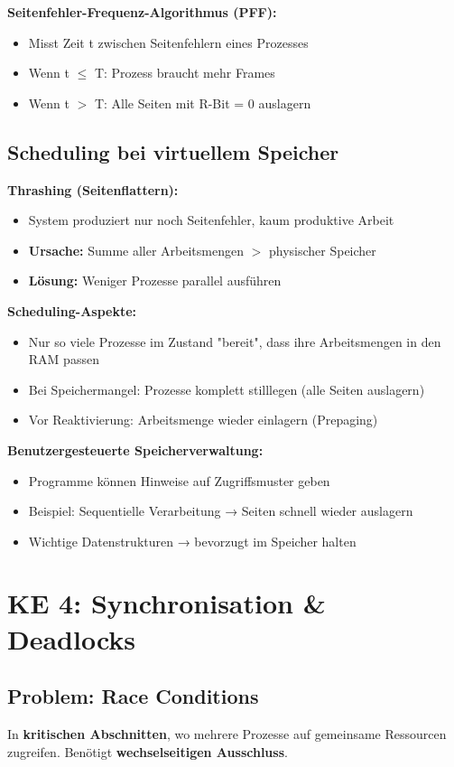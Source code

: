 \documentclass[9pt,a4paper]{extarticle}
\begin{document}
\begin{multicols*}{2}
\textbf{Seitenfehler-Frequenz-Algorithmus (PFF):}
\begin{itemize}
\item Misst Zeit t zwischen Seitenfehlern eines Prozesses
\item Wenn t $\leq$ T: Prozess braucht mehr Frames
\item Wenn t $>$ T: Alle Seiten mit R-Bit = 0 auslagern
\end{itemize}

\subsection{Scheduling bei virtuellem Speicher}
\textbf{Thrashing (Seitenflattern):}
\begin{itemize}
\item System produziert nur noch Seitenfehler, kaum produktive Arbeit
\item \textbf{Ursache:} Summe aller Arbeitsmengen $>$ physischer Speicher
\item \textbf{Lösung:} Weniger Prozesse parallel ausführen
\end{itemize}

\textbf{Scheduling-Aspekte:}
\begin{itemize}
\item Nur so viele Prozesse im Zustand "bereit", dass ihre Arbeitsmengen in den RAM passen
\item Bei Speichermangel: Prozesse komplett stilllegen (alle Seiten auslagern)
\item Vor Reaktivierung: Arbeitsmenge wieder einlagern (Prepaging)
\end{itemize}

\textbf{Benutzergesteuerte Speicherverwaltung:}
\begin{itemize}
\item Programme können Hinweise auf Zugriffsmuster geben
\item Beispiel: Sequentielle Verarbeitung → Seiten schnell wieder auslagern
\item Wichtige Datenstrukturen → bevorzugt im Speicher halten
\end{itemize}

\section{KE 4: Synchronisation \& Deadlocks}

\subsection{Problem: Race Conditions}
In \textbf{kritischen Abschnitten}, wo mehrere Prozesse auf gemeinsame Ressourcen zugreifen. Benötigt \textbf{wechselseitigen Ausschluss}.


\end{multicols*}
\end{document}
